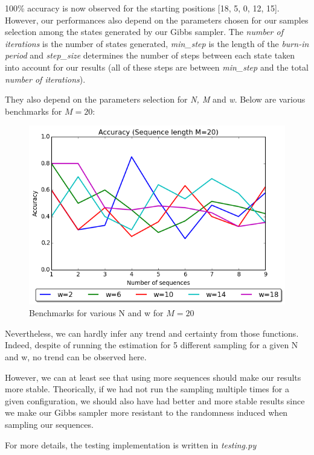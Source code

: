 100\% accuracy is now observed for the starting positions [18, 5, 0, 12, 15].
\\

However, our performances also depend on the parameters chosen for our samples selection among the states generated by our Gibbs sampler.
The \textit{number of iterations} is the number of states generated, \textit{min\_step} is the length of the \textit{burn-in period} and \textit{step\_size} determines the number of steps between each state taken into account for our results (all of these steps are between \textit{min\_step} and the total \textit{number of iterations}).

They also depend on the parameters selection for \textit{N, M} and \textit{w}. Below are various benchmarks for $M = 20$:

\begin{figure}[H]
\centering
\includegraphics[width=0.7\linewidth]{img/tests.png}
\caption{Benchmarks for various N and w for $M = 20$}
\end{figure}

Nevertheless, we can hardly infer any trend and certainty from those functions. Indeed, despite of running the estimation for 5 different sampling for a given N and w, no trend can be observed here.

However, we can at least see that using more sequences should make our results more stable. Theorically, if we had not run the sampling multiple times for a given configuration, we should also have had better and more stable results since we make our Gibbs sampler more resistant to the randomness induced when sampling our sequences.

For more details, the testing implementation is written in \textit{testing.py}
